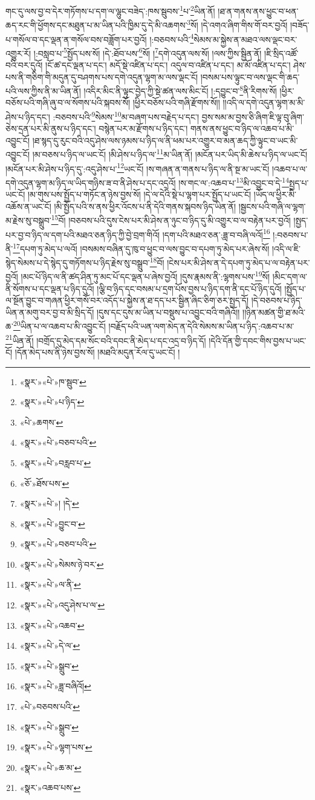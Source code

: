 གང་དུ་ལས་བྱ་བ་དེར་གཏོགས་པ་དག་ལ་ལྷུང་བཟེད་:ཁས་སྦུབས་\footnote{«སྣར་»«པེ་»ཁ་སྦུབ་}པ་\footnote{«སྣར་»«པེ་»པ་ཉིད་}ཡིན་ནོ། །ཐ་ན་གནས་ནས་ཕྱུང་བ་ཕན་ཆད་རང་གི་ཕྱོགས་དང་མཐུན་པ་མ་ཡིན་པའི་ཁྱིམ་དུ་དེ་མི་འཆགས་\footnote{«པེ་»ཆགས་}སོ། །དེ་འགའ་ཞིག་གིས་གོ་བར་བྱའོ། །བཟོད་པ་གསོལ་བ་དང་ལྡན་ན་གསོལ་བས་བཟློག་པར་བྱའོ། །:བཅབས་པའི་\footnote{«སྣར་»«པེ་»བཅབ་པའི་}སེམས་མ་སྐྱེས་ན་མཐའ་ལས་ལྡང་བར་འགྱུར་རོ། །:བསླབ་པ་\footnote{«སྣར་»«པེ་»བརླབ་པ་}སྤྱོད་པས་སོ། །དེ་:ཐོབ་པས་\footnote{«ཅོ་»ཐོས་པས་}སོ། །\footnote{«སྣར་»«པེ་»། །དེ་}དགེ་འདུན་ལས་སོ། །ལས་ཀྱིས་སྦྱིན་ནོ། །ཇི་སྲིད་འཚོ་བའི་བར་དུའོ། །ངོ་ཚ་དང་ལྡན་པ་དང་། མདོ་སྡེ་འཛིན་པ་དང་། འདུལ་བ་འཛིན་པ་དང་། མ་མོ་འཛིན་པ་དང་། ཤེས་པས་ནི་གཅིག་གི་མདུན་དུ་བཤགས་པས་དགེ་འདུན་ལྷག་མ་ལས་ལྡང་ངོ། །བསམ་པས་ལྟུང་བ་ལས་ལྡང་གི་ཆད་པའི་ལས་ཀྱིས་ནི་མ་ཡིན་ནོ། །འདིར་མིང་ནི་ལྟུང་བྱེད་ཀྱི་སྡེ་ཚན་ལས་མིང་ངོ། །:དབྱུང་བ་\footnote{«སྣར་»«པེ་»བྱུང་བ་}ནི་རིགས་སོ། །ཕྱིར་བཅོས་པའི་གཞི་ཞུ་བ་ལ་སོགས་པའི་སྐབས་སོ། །ཕྱིར་བཅོས་པའི་གཞི་རྫོགས་སོ།། །།འདི་ལ་དགེ་འདུན་ལྷག་མ་མི་ཤེས་པ་ཉིད་དང་། :བཅབས་པའི་\footnote{«སྣར་»«པེ་»བཅབ་པའི་}སེམས་\footnote{«སྣར་»«པེ་»སེམས་ཉེ་བར་}མ་བཞག་པས་བརྗེད་པ་དང་། བྱས་སམ་མ་བྱས་ཅི་ཞིག་ཇི་ལྟ་བུ་ཞིག་ཅེས་དྲན་པར་མི་ནུས་པ་ཉིད་དང་། བསྙེན་པར་མ་རྫོགས་པ་ཉིད་དང་། གནས་ནས་ཕྱུང་བ་ཉིད་ལ་འཆབ་པ་མི་འབྱུང་ངོ། །ཐ་སྙད་དུ་རུང་བའི་འདུ་ཤེས་ལས་ཉམས་པ་ཉིད་ལ་ནི་ཕམ་པར་འགྱུར་བ་མན་ཆད་ཀྱི་ལྟུང་བ་ཡང་མི་འབྱུང་ངོ། །མ་བཅས་པ་ཉིད་ལ་ཡང་ངོ། །མི་ཤེས་པ་ཉིད་ལ་\footnote{«སྣར་»«པེ་»ལ་ནི་}མ་ཡིན་ནོ། །མངོན་པར་ཡིད་མི་ཆེས་པ་ཉིད་ལ་ཡང་ངོ། །མངོན་པར་མི་ཤེས་པ་ཉིད་དུ་:འདུ་ཤེས་པ་\footnote{«སྣར་»«པེ་»འདུ་ཤེས་པ་ལ་}ཡང་ངོ། །ས་གཞན་ན་གནས་པ་ཉིད་ལ་ནི་སྔ་མ་ཡང་ངོ། །འཆབ་པ་ལ་དགེ་འདུན་ལྷག་མ་ཉིད་ལ་ཡིད་གཉིས་ཟ་བ་ནི་ཤེས་པ་དང་འདྲའོ། །ས་གང་ལ་:འཆབ་པ་\footnote{«སྣར་»«པེ་»འཆབ་}མི་འབྱུང་བ་དེ་\footnote{«སྣར་»«པེ་»དེ་ལ་}སྤྱད་པ་ཡང་ངོ། །མ་གུས་པས་སྤྱོད་པ་གཏོང་ན་ཉེས་བྱས་སོ། །དེ་ལ་དེའི་སྡེ་པ་ལྷག་པར་སྤྱོད་པ་ཡང་ངོ། །ཡོད་ལ་ཕྱིར་མི་འཆོས་ན་ཡང་ངོ། །མི་སྤྱོད་པའི་ས་ནས་ཕྱིར་འོངས་པ་ནི་དེའི་གནས་སྐབས་ཉིད་ཡིན་ནོ། །སྦྱངས་པའི་གཞི་ལ་ལྷག་མ་རྗེས་སུ་བསྒྲུབ་\footnote{«སྣར་»«པེ་»སྒྲུབ་}བོ། །བཅབས་པའི་དུས་ངེས་པར་མི་ཤེས་ན་ཉུང་བ་ཉིད་དུ་མི་འགྱུར་བ་ལ་བརྟེན་པར་བྱའོ། །སྤྱད་པར་བྱ་བ་ཉིད་ལ་དག་པའི་མཐའ་ཅན་ཉིད་ཀྱི་བྱེ་བྲག་གིའོ། །དག་པའི་མཐའ་ཅན་:ཟླ་བ་བཞི་ལའོ།\footnote{«སྣར་»«པེ་»ཟླ་བཞིའོ།} །:བཅབས་པ་ནི་\footnote{«པེ་»བཅབས་པའི་}དཔག་ཏུ་མེད་པ་ལའོ། །བསམས་བཞིན་དུ་ཁུ་བ་ཕྱུང་བ་ལས་བྱུང་བ་དཔག་ཏུ་མེད་པར་ཞེས་སོ། །འདི་ལ་ཇི་སྙེད་སེམས་པ་དེ་སྙེད་དུ་གཏོགས་པ་ཉིད་རྗེས་སུ་བསྒྲུབ་\footnote{«སྣར་»«པེ་»སྒྲུབ་}བོ། །ངེས་པར་མི་ཤེས་ན་དེ་དཔག་ཏུ་མེད་པ་ལ་བརྟེན་པར་བྱའོ། །མང་པོ་ཉིད་ལ་ནི་ཚད་ཤིན་ཏུ་མང་པོ་དང་ལྡན་པ་ཞེས་བྱའོ། །དུས་རྣམས་ནི་:ལྷགས་པས་\footnote{«སྣར་»«པེ་»ལྷག་པས་}སོ། །མིང་དག་ལ་ནི་སོགས་པ་དང་ལྡན་པ་ཉིད་དུའོ། །ལྕི་བ་ཉིད་དང་བསམ་པ་དྲག་པོས་བྱས་པ་ཉིད་དག་ནི་དང་པོ་ཉིད་དུའོ། །སྤྱོད་པ་ལ་སྔོན་བྱུང་བ་གཞན་ཕྱིར་གསོ་བར་འདོད་པ་སྐྱེས་ན་ཐ་དད་པར་སྦྱིན་ཞིང་ཅིག་ཅར་སྤྱད་དོ། །དེ་བཅབས་པ་ཉིད་ཡིན་ན་མགུ་བར་བྱ་བ་མི་སྲིད་དོ། །དུས་དང་དུས་མ་ཡིན་པ་བསྡུས་པ་འབྱུང་བའི་གཞིའོ།། །།ཉིན་མཚན་གྱི་ཐ་མའི་ཆ་\footnote{«སྣར་»«པེ་»ཆ་མ་}ཡིན་པ་ལ་འཆབ་པ་མི་འབྱུང་ངོ། །བརྗོད་པའི་ཡན་ལག་མེད་ན་དེའི་སེམས་མ་ཡིན་པ་ཉིད་:འཆབ་པ་མ་\footnote{«སྣར་»འཆབ་པས་}ཡིན་ནོ། །བགྲོད་དུ་མེད་དམ་སོང་བའི་དབང་ནི་མེད་པ་དང་འདྲ་བ་ཉིད་དོ། །དེའི་དོན་གྱི་དབང་གིས་བྱས་པ་ཡང་ངོ། །དོན་མེད་པས་ནི་ཉེས་བྱས་སོ། །མཐའི་མདུན་རོལ་དུ་ཡང་ངོ། །
